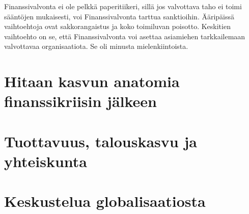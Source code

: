 \documentclass[12pt]{article}
\begin{document}
Finanssivalvonta ei ole pelkkä paperitiikeri, sillä jos valvottava taho ei toimi sääntöjen mukaisesti, voi Finanssivalvonta tarttua sanktioihin. Ääripäissä vaihtoehtoja ovat sakkorangaistus ja koko toimiluvan poisotto. Keskitien vaihtoehto on se, että Finanssivalvonta voi asettaa asiamiehen tarkkailemaan valvottavaa organisaatiota. Se oli minusta mielenkiintoista.


\newpage
\section{Hitaan kasvun anatomia finanssikriisin jälkeen}


\newpage
\section{Tuottavuus, talouskasvu ja yhteiskunta}


\newpage
\section{Keskustelua globalisaatiosta}
\end{document}
